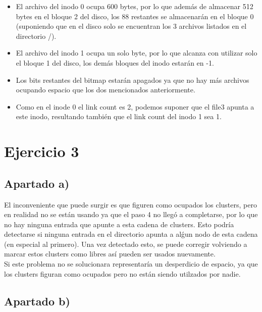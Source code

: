 \documentclass[11pt]{article}
\begin{document}
\begin{itemize}
    \item El archivo del inodo 0 ocupa 600 bytes, por lo que además de almacenar
          512 bytes en el bloque 2 del disco, los 88 restantes se almacenarán
          en el bloque 0 (suponiendo que en el disco solo se encuentran los
          3 archivos listados en el directorio /).
    \item El archivo del inodo 1 ocupa un solo byte, por lo que alcanza con
          utilizar solo el bloque 1 del disco, los demás bloques del inodo
          estarán en -1.
    \item Los bits restantes del bitmap estarán apagados ya que no hay más archivos
          ocupando espacio que los dos mencionados anteriormente.
    \item Como en el inode 0 el link count es 2, podemos suponer que el file3
          apunta a este inodo, resultando también que el link count del inodo 1
          sea 1.
\end{itemize}

\section*{Ejercicio 3}

\subsection*{Apartado a)}

El inconveniente que puede surgir es que figuren como ocupados los clusters, 
pero en realidad no se están usando ya que el paso 4 no llegó a completarse, por
lo que no hay ninguna entrada que apunte a esta cadena de clusters. Esto podría
detectarse si ninguna entrada en el directorio apunta a alǵun nodo de esta cadena
(en especial al primero). Una vez detectado esto, se puede corregir
volviendo a marcar estos clusters como libres así pueden ser usados nuevamente. \\

Si este problema no se solucionara representaría un desperdicio de espacio, ya que
los clusters figuran como ocupados pero no están siendo utilzados por nadie.

\subsection*{Apartado b)}
\end{document}
